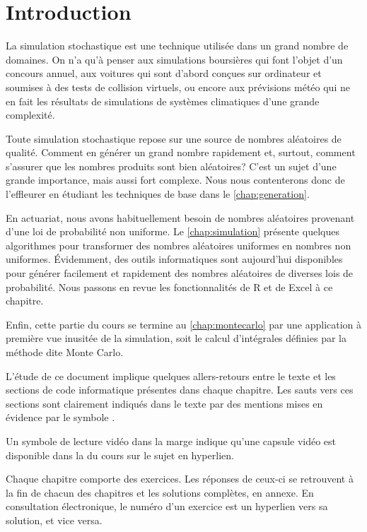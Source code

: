 \chapter*{Introduction}

La simulation stochastique est une technique utilisée dans un grand
nombre de domaines. On n'a qu'à penser aux simulations boursières qui
font l'objet d'un concours annuel, aux voitures qui sont d'abord
conçues sur ordinateur et soumises à des tests de collision virtuels,
ou encore aux prévisions météo qui ne en fait les résultats de
simulations de systèmes climatiques d'une grande complexité.

Toute simulation stochastique repose sur une source de nombres
aléatoires de qualité. Comment en générer un grand nombre rapidement
et, surtout, comment s'assurer que les nombres produits sont bien
aléatoires? C'est un sujet d'une grande importance, mais aussi fort
complexe. Nous nous contenterons donc de l'effleurer en étudiant les
techniques de base dans le \autoref{chap:generation}.

En actuariat, nous avons habituellement besoin de nombres aléatoires
provenant d'une loi de probabilité non uniforme. Le
\autoref{chap:simulation} présente quelques algorithmes pour
transformer des nombres aléatoires uniformes en nombres non uniformes.
Évidemment, des outils informatiques sont aujourd'hui disponibles pour
générer facilement et rapidement des nombres aléatoires de diverses
lois de probabilité. Nous passons en revue les fonctionnalités de R et
de Excel à ce chapitre.

Enfin, cette partie du cours se termine au
\autoref{chap:montecarlo} par une application à première vue
inusitée de la simulation, soit le calcul d'intégrales définies par la
méthode dite Monte Carlo.

L'étude de ce document implique quelques allers-retours entre le texte
et les sections de code informatique présentes dans chaque chapitre.
Les sauts vers ces sections sont clairement indiqués dans le texte par
des mentions mises en évidence par le symbole {\ForwardToEnd}.

Un symbole de lecture vidéo dans la marge indique qu'une capsule vidéo
est disponible dans la %
du cours sur le sujet en hyperlien.

Chaque chapitre comporte des exercices. Les réponses de ceux-ci se
retrouvent à la fin de chacun des chapitres et les solutions complètes,
en annexe. En consultation électronique, le numéro d'un exercice est
un hyperlien vers sa solution, et vice versa.

